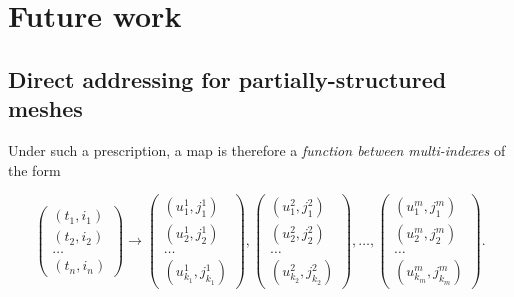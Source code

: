 \section{Future work}
\label{sec:future}

\subsection{Direct addressing for partially-structured meshes}
\label{sec:future_partialstructure}




Under such a prescription, a map is therefore a \textit{function between multi-indexes} of the form

\vspace{1em}

\begin{equation*}
  \begin{pmatrix} (t_1, i_1) \\ (t_2, i_2) \\ \dots \\ (t_n, i_n) \end{pmatrix}
  \to
  \begin{pmatrix} (u^1_1, j^1_1) \\ (u^1_2, j^1_2) \\ \dots \\ (u^1_{k_1}, j^1_{k_1}) \end{pmatrix}
  ,
  \begin{pmatrix} (u^2_1, j^2_1) \\ (u^2_2, j^2_2) \\ \dots \\ (u^2_{k_2}, j^2_{k_2}) \end{pmatrix}
  , \dots ,
  \begin{pmatrix} (u^m_1, j^m_1) \\ (u^m_2, j^m_2) \\ \dots \\ (u^m_{k_m}, j^m_{k_m}) \end{pmatrix}.
\end{equation*}

